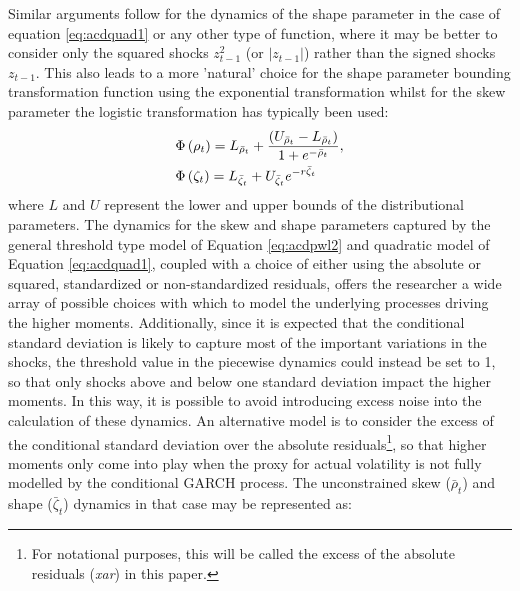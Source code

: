 Similar arguments follow for the dynamics of the shape parameter in the case of equation \ref{eq:acdquad1} or any other type of function, where it may be better to consider only the squared shocks $z_{t-1}^2$ (or $|z_{t-1}|$) rather than the signed shocks $z_{t-1}$. This also leads to a more 'natural' choice for the shape parameter bounding transformation function using the exponential transformation whilst for the skew parameter the logistic transformation has typically been used:
\begin{equation}\label{eq:acdtransform}
\begin{gathered}
  \Phi \left( {{\rho _t}} \right) = {L_{{{\bar \rho }_t}}} + \frac{{({U_{{{\bar \rho }_t}}} - {L_{{{\bar \rho }_t}}})}}
{{1 + {e^{ - {{\bar \rho }_t}}}}},\hfill \\
  \Phi \left( {{\zeta _t}} \right) = {L_{{\bar \zeta _t}}} + {U_{{\bar \zeta _t}}}{e^{ - r{{\bar \zeta }_t}}} \hfill \\
\end{gathered}
\end{equation}
where $L$ and $U$ represent the lower and upper bounds of the distributional parameters. The dynamics for the skew and shape parameters captured by the general threshold type model of Equation \ref{eq:acdpwl2} and quadratic model of Equation \ref{eq:acdquad1}, coupled with a choice of either using the absolute or squared, standardized or non-standardized residuals, offers the researcher a wide array of possible choices with which to model the underlying processes driving the higher moments. Additionally, since it is expected that the conditional standard deviation is likely to capture most of the important variations in the shocks, the threshold value in the piecewise dynamics could instead be set to 1, so that only shocks above and below one standard deviation impact the higher moments. In this way, it is possible to avoid introducing excess noise into the calculation of these dynamics. An alternative model is to consider the excess of the conditional standard deviation over the absolute residuals\footnote{For notational purposes, this will be called the excess of the absolute residuals (\emph{xar}) in this paper.}, so that higher moments only come into play when the proxy for actual volatility is not fully modelled by the conditional GARCH process. The unconstrained skew ($\bar \rho_t$) and shape ($\bar \zeta_t$) dynamics in that case may be represented as:
